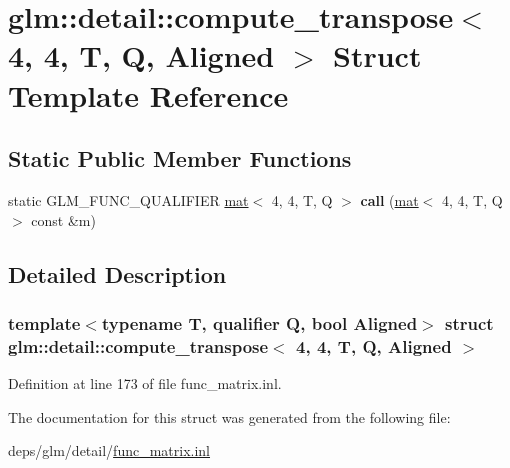 \hypertarget{structglm_1_1detail_1_1compute__transpose_3_014_00_014_00_01T_00_01Q_00_01Aligned_01_4}{}\section{glm\+:\+:detail\+:\+:compute\+\_\+transpose$<$ 4, 4, T, Q, Aligned $>$ Struct Template Reference}
\label{structglm_1_1detail_1_1compute__transpose_3_014_00_014_00_01T_00_01Q_00_01Aligned_01_4}
\subsection*{Static Public Member Functions}
\begin{DoxyCompactItemize}
\item 
\mbox{\label{structglm_1_1detail_1_1compute__transpose_3_014_00_014_00_01T_00_01Q_00_01Aligned_01_4_a1c83bd028bacc75a9992bae671fdace4}} 
static G\+L\+M\+\_\+\+F\+U\+N\+C\+\_\+\+Q\+U\+A\+L\+I\+F\+I\+ER \hyperlink{structglm_1_1mat}{mat}$<$ 4, 4, T, Q $>$ {\bfseries call} (\hyperlink{structglm_1_1mat}{mat}$<$ 4, 4, T, Q $>$ const \&m)
\end{DoxyCompactItemize}


\subsection{Detailed Description}
\subsubsection*{template$<$typename T, qualifier Q, bool Aligned$>$\newline
struct glm\+::detail\+::compute\+\_\+transpose$<$ 4, 4, T, Q, Aligned $>$}



Definition at line 173 of file func\+\_\+matrix.\+inl.



The documentation for this struct was generated from the following file\+:\begin{DoxyCompactItemize}
\item 
deps/glm/detail/\hyperlink{func__matrix_8inl}{func\+\_\+matrix.\+inl}\end{DoxyCompactItemize}
